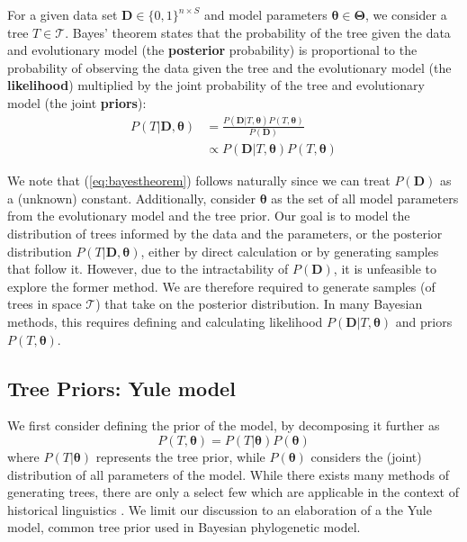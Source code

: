 \begin{definition} 
    For a given data set $\mathbf{D} \in \{0, 1\}^{n \times S}$ and model parameters $\boldsymbol{\theta} \in \boldsymbol{\Theta}$, we consider a tree $T \in \mathcal{T}$. Bayes' theorem states that the probability of the tree given the data and evolutionary model (the \textbf{posterior} probability) is proportional to the probability of observing the data given the tree and the evolutionary model (the \textbf{likelihood}) multiplied by the joint probability of the tree and evolutionary model (the joint \textbf{priors}):
    \begin{align}
        P(T | \mathbf{D}, \boldsymbol{\theta}) &= \frac{P(\mathbf{D} | T, \boldsymbol{\theta})P(T, \boldsymbol{\theta})}{P(\mathbf{D})} \\
        &\propto P(\mathbf{D} | T, \boldsymbol{\theta})P(T,\boldsymbol{\theta}) \label{eq:bayestheorem}
    \end{align}
\end{definition}

We note that (\ref{eq:bayestheorem}) follows naturally since we can treat $P(\mathbf{D})$ as a (unknown) constant. Additionally, consider $\boldsymbol{\theta}$ as the set of all model parameters from the evolutionary model and the tree prior. Our goal is to model the distribution of trees informed by the data and the parameters, or the posterior distribution $P(T | \mathbf{D}, \boldsymbol{\theta})$, either by direct calculation or by generating samples that follow it. However, due to the intractability of $P(\mathbf{D})$, it is unfeasible to explore the former method. We are therefore required to generate samples (of trees in space $\mathcal{T}$) that take on the posterior distribution. In many Bayesian methods, this requires defining and calculating likelihood $P(\mathbf{D} | T, \boldsymbol{\theta})$ and priors $P(T, \boldsymbol{\theta})$.

\subsection{Tree Priors: Yule model}
We first consider defining the prior of the model, by decomposing it further as
\begin{equation}
    P(T, \boldsymbol{\theta}) = P(T|\boldsymbol{\theta})P(\boldsymbol{\theta}) \label{eq:priors}
\end{equation}
where $P(T|\boldsymbol{\theta})$ represents the tree prior, while $P(\boldsymbol{\theta})$ considers the (joint) distribution of all parameters of the model. While there exists many methods of generating trees, there are only a select few which are applicable in the context of historical linguistics \cite{hoffmann_bayesian_2021}. We limit our discussion to an elaboration of a the Yule model, common tree prior used in Bayesian phylogenetic model.

